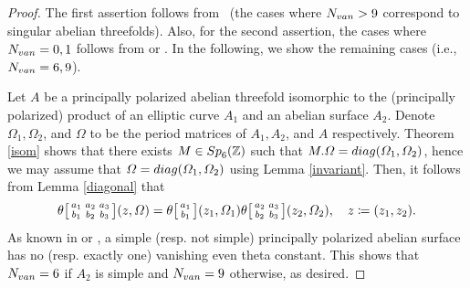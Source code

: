 \documentclass{amsart}
\theoremstyle{definition}
\theoremstyle{plain}
\begin{document}
\begin{proof}
The first assertion follows from \cite[Theorem 3.1]{Glass}\ (the cases where $N_{\rm van} > 9$ correspond to singular abelian threefolds).
Also, for the second assertion, the cases where $N_{\rm van}=0,1$ follows from \cite[Theorem 2]{Oyono} or \cite[Remark 6.3]{Pieper}.
In the following, we show the remaining cases (i.e., $N_{\rm van} = 6,9$).\par
Let $A$ be a principally polarized abelian threefold isomorphic to the (principally polarized) product of an elliptic curve $A_1$ and an abelian surface $A_2$.
Denote $\varOmega_1,\varOmega_2$, and $\varOmega$ to be the period matrices of $A_1,A_2$, and $A$ respectively. 
Theorem \ref{isom} shows that there exists $M \in {\rm Sp}_6(\mathbb{Z})$ such that $M.\varOmega = {\rm diag}(\varOmega_1,\varOmega_2)$, hence we may assume that $\varOmega = {\rm diag}(\varOmega_1,\varOmega_2)$ using Lemma \ref{invariant}.
Then, it follows from Lemma \ref{diagonal} that\smallskip
\[
    \theta\bigl[\begin{smallmatrix}a_1 & a_2 & a_3\\b_1 & b_2 & b_3\end{smallmatrix}\bigr](z,\varOmega) = \theta\bigl[\begin{smallmatrix}a_1\\b_1\end{smallmatrix}\bigr](z_1,\varOmega_1)\theta\bigl[\begin{smallmatrix}a_2 & a_3\\b_2 & b_3\end{smallmatrix}\bigr](z_2,\varOmega_2), \quad z \coloneqq (z_1,z_2).\medskip
\]
As known in \cite[Remark 3.5]{LR} or \cite[$\S 16.4$]{Robert}, a simple (resp. not simple) principally polarized abelian surface has no (resp. exactly one) vanishing even theta constant.
This shows that $N_{\rm van} = 6$ if $A_2$ is simple and $N_{\rm van} = 9$ otherwise, as desired.
\end{proof}
\end{document}

